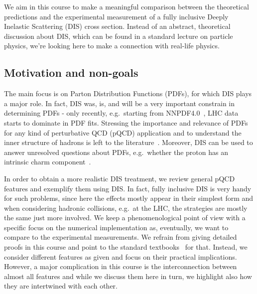 
We aim in this course to make a meaningful comparison between the theoretical predictions and the experimental measurement of a fully inclusive Deeply Inelastic Scattering (DIS) cross section.
Instead of an abstract, theoretical discussion about DIS, which can be found in a standard lecture on particle physics, we're looking here to make a connection with real-life physics.

\subsection{Motivation and non-goals}
The main focus is on Parton Distribution Functions (PDFs), for which DIS plays a major role.
In fact, DIS was, is, and will be a very important constrain in determining PDFs - only recently, e.g.\ starting from NNPDF4.0~\cite{NNPDF:2021njg}, LHC data starts to dominate in PDF fits.
Stressing the importance and relevance of PDFs for any kind of perturbative QCD (pQCD) application and to understand the inner structure of hadrons is left to the literature~\cite{Gao:2017yyd,Heinrich:2020ybq,Amoroso:2022eow}.
Moreover, DIS can be used to answer unresolved questions about PDFs, e.g.\ whether the proton has an intrinsic charm component~\cite{Ball:2022qks,NNPDF:2023tyk}.

In order to obtain a more realistic DIS treatment, we review general pQCD features and exemplify them using DIS.
In fact, fully inclusive DIS is very handy for such problems, since here the effects mostly appear in their simplest form and when considering hadronic collisions, e.g.\ at the LHC, the strategies are mostly the same just more involved.
We keep a phenomenological point of view with a specific focus on the numerical implementation as, eventually, we want to compare to the experimental measurements.
We refrain from giving detailed proofs in this course and point to the standard textbooks~\cite{Leader:2011gpt,Leader:1996hm,Peskin:1995ev,Halzen:1984mc,Kronfeld:2010bx} for that.
Instead, we consider different features as given and focus on their practical implications.
However, a major complication in this course is the interconnection between almost all features and while we discuss them here in turn, we highlight also how they are intertwined with each other.


